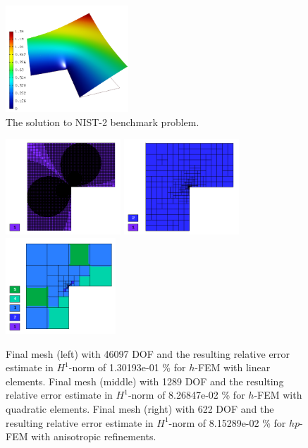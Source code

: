 \documentclass[12pt]{elsarticle}
\begin{document}
\begin{figure}[H]
\centering
\vspace{-5mm}
\includegraphics[height=4cm]{nist/nist-2/solution.png}
\vspace{-5mm}
\caption{The solution to NIST-2 benchmark problem.}
\vspace{-5mm}
\label{fig:sln-nist02}
\end{figure}

\begin{figure}[H]
\centering
\vspace{-5mm}
\includegraphics[height=3.6cm]{nist/nist-2/mesh_h1_aniso.png}
\includegraphics[height=3.6cm]{nist/nist-2/mesh_h2_aniso.png}
\includegraphics[height=3.6cm]{nist/nist-2/mesh_hp_aniso.png}
\vspace{-5mm}
\caption{
Final mesh (left) with 46097 DOF and the resulting
relative error estimate in $H^1$-norm of 1.30193e-01 \% for $h$-FEM with linear elements.
Final mesh (middle) with 1289 DOF and the resulting
relative error estimate in $H^1$-norm of 8.26847e-02 \% for $h$-FEM with quadratic elements.
Final mesh (right) with 622 DOF and the resulting
relative error estimate in $H^1$-norm of 8.15289e-02 \% for $hp$-FEM with anisotropic refinements.}
\vspace{-5mm}
\label{fig:nist-2-hp-aniso}
\end{figure}
\end{document}
